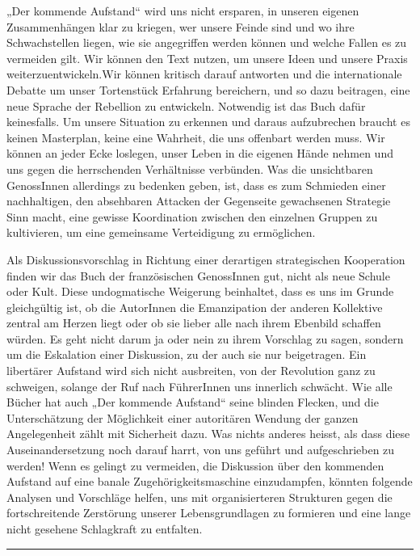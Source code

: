 „Der kommende Aufstand“ wird uns nicht ersparen, in unseren eigenen
Zusammenhängen klar zu kriegen, wer unsere Feinde sind und wo ihre
Schwachstellen liegen, wie sie angegriffen werden können und welche
Fallen es zu vermeiden gilt. Wir können den Text nutzen, um unsere
Ideen und unsere Praxis weiterzuentwickeln.Wir können kritisch
darauf antworten und die internationale Debatte um unser
Tortenstück Erfahrung bereichern, und so dazu beitragen, eine neue
Sprache der Rebellion zu entwickeln. Notwendig ist das Buch dafür
keinesfalls. Um unsere Situation zu erkennen und daraus
aufzubrechen braucht es keinen Masterplan, keine eine Wahrheit, die
uns offenbart werden muss. Wir können an jeder Ecke loslegen, unser
Leben in die eigenen Hände nehmen und uns gegen die herrschenden
Verhältnisse verbünden. Was die unsichtbaren GenossInnen allerdings
zu bedenken geben, ist, dass es zum Schmieden einer nachhaltigen,
den absehbaren Attacken der Gegenseite gewachsenen Strategie Sinn
macht, eine gewisse Koordination zwischen den einzelnen Gruppen zu
kultivieren, um eine gemeinsame Verteidigung zu ermöglichen.
\extrapar{}

Als Diskussionsvorschlag in Richtung einer derartigen strategischen
Kooperation finden wir das Buch der französischen GenossInnen gut,
nicht als neue Schule oder Kult. Diese undogmatische Weigerung
beinhaltet, dass es uns im Grunde gleichgültig ist, ob die
AutorInnen die Emanzipation der anderen Kollektive zentral am
Herzen liegt oder ob sie lieber alle nach ihrem Ebenbild schaffen
würden. Es geht nicht darum ja oder nein zu ihrem Vorschlag zu
sagen, sondern um die Eskalation einer Diskussion, zu der auch sie
nur beigetragen. Ein libertärer Aufstand wird sich nicht
ausbreiten, von der Revolution ganz zu schweigen, solange der Ruf
nach FührerInnen uns innerlich schwächt. Wie alle Bücher hat auch
„Der kommende Aufstand“ seine blinden Flecken, und die
Unterschätzung der Möglichkeit einer autoritären Wendung der ganzen
Angelegenheit zählt mit Sicherheit dazu. Was nichts anderes heisst,
als dass diese Auseinandersetzung noch darauf harrt, von uns
geführt und aufgeschrieben zu werden! Wenn es gelingt zu vermeiden,
die Diskussion über den kommenden Aufstand auf eine banale
Zugehörigkeitsmaschine einzudampfen, könnten folgende Analysen und
Vorschläge helfen, uns mit organisierteren Strukturen gegen die
fortschreitende Zerstörung unserer Lebensgrundlagen zu formieren
und eine lange nicht gesehene Schlagkraft zu entfalten.

\begin{center}\rule{3in}{0.4pt}\end{center}

